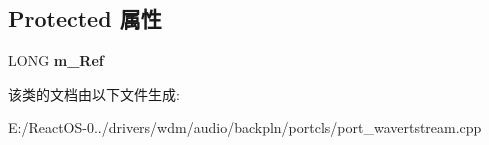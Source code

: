 \subsection*{Protected 属性}
\begin{DoxyCompactItemize}
\item 
\mbox{\label{class_c_port_wave_r_t_stream_init_a23ab3442a4749ddb83f9f7cb6a362ea9}} 
L\+O\+NG {\bfseries m\+\_\+\+Ref}
\end{DoxyCompactItemize}


该类的文档由以下文件生成\+:\begin{DoxyCompactItemize}
\item 
E\+:/\+React\+O\+S-\/0../drivers/wdm/audio/backpln/portcls/port\+\_\+wavertstream.\+cpp\end{DoxyCompactItemize}
